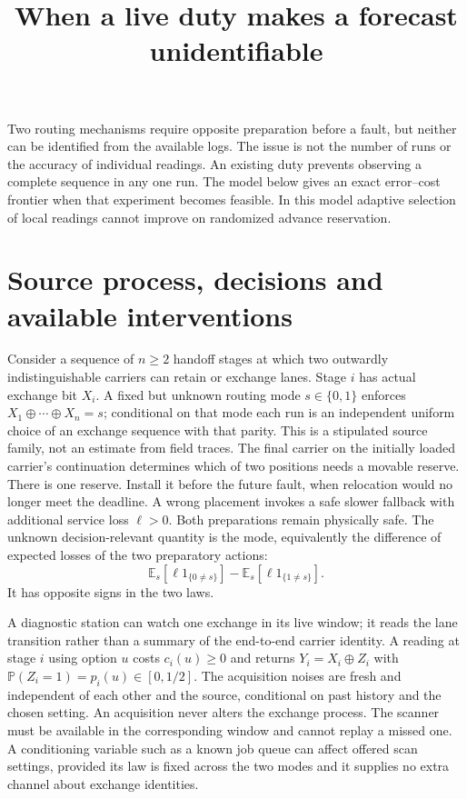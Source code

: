 \documentclass[11pt]{article}
\title{When a live duty makes a forecast unidentifiable}
\date{}
\begin{document}
\maketitle

Two routing mechanisms require opposite preparation before a fault,
but neither can be identified from the available logs. The issue is
not the number of runs or the accuracy of individual readings.
An existing duty prevents observing a complete sequence in any one
run. The model below gives an exact error--cost frontier when that
experiment becomes feasible. In this model adaptive selection of
local readings cannot improve on randomized advance reservation.

\section{Source process, decisions and available interventions}
Consider a sequence of \(n\ge2\) handoff stages at which two outwardly
indistinguishable carriers can retain or exchange lanes. Stage \(i\)
has actual exchange bit \(X_i\). A fixed but unknown routing mode
\(s\in\{0,1\}\) enforces \(X_1\oplus\cdots\oplus X_n=s\); conditional
on that mode each run is an independent uniform choice of an exchange
sequence with that parity. This is a stipulated source family, not
an estimate from field traces. The final carrier on the initially
loaded carrier's continuation determines which of two positions needs
a movable reserve. There is one reserve. Install it before the
future fault, when relocation would no longer meet the deadline.
A wrong placement invokes a safe slower fallback with additional
service loss \(\ell>0\). Both preparations remain physically safe.
The unknown decision-relevant quantity is the mode, equivalently
the difference of expected losses of the two preparatory actions:
\[
  \mathbb E_s[\ell 1_{\{0\ne s\}}]-\mathbb E_s[\ell 1_{\{1\ne s\}}].
\]
It has opposite signs in the two laws.

A diagnostic station can watch one exchange in its live window;
it reads the lane transition rather than a summary of the end-to-end
carrier identity. A reading at stage \(i\) using option \(u\) costs
\(c_i(u)\ge0\) and returns \(Y_i=X_i\oplus Z_i\) with
\(\mathbb P(Z_i=1)=p_i(u)\in[0,1/2]\). The acquisition noises are
fresh and independent of each other and the source, conditional on
past history and the chosen setting. An acquisition never alters the
exchange process. The scanner must be available in the corresponding
window and cannot replay a missed one. A conditioning variable such
as a known job queue can affect offered scan settings, provided its
law is fixed across the two modes and it supplies no extra channel
about exchange identities.
\end{document}
